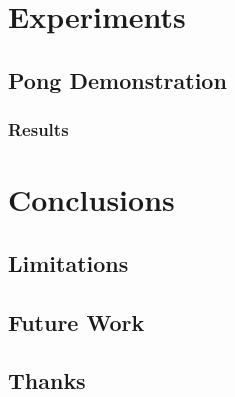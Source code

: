 \documentclass{report}
\begin{document}

\chapter{Experiments} 
\section{Pong Demonstration}
\subsection{Results}

\chapter{Conclusions}
\section{Limitations}
\section{Future Work}

\section{Thanks}
\end{document}
